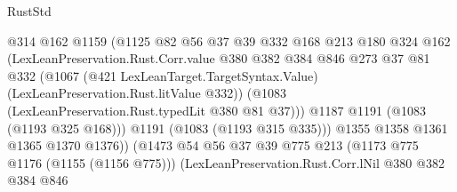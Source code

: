 \begin{lexlean}{RustStd}
\begin{coremodule}
                                        @314
                                        @162
                                        @1159
                                        (@1125
                                          @82
                                          @56
                                          @37
                                          @39
                                          @332
                                          @168
                                          @213
                                          @180
                                          @324
                                          @162
                                          (LexLeanPreservation.Rust.Corr.value
                                            @380
                                            @382
                                            @384
                                            @846
                                            @273
                                            @37
                                            @81
                                            @332
                                            (@1067
                                              (@421 LexLeanTarget.TargetSyntax.Value)
                                              (LexLeanPreservation.Rust.litValue @332))
                                            (@1083
                                              (LexLeanPreservation.Rust.typedLit @380 @81 @37)))
                                          @1187
                                          @1191
                                          (@1083 (@1193 @325 @168)))
                                        @1191
                                        (@1083 (@1193 @315 @335)))
                                      @1355
                                      @1358
                                      @1361
                                      @1365
                                      @1370
                                      @1376))
                                  (@1473
                                    @54
                                    @56
                                    @37
                                    @39
                                    @775
                                    @213
                                    (@1173 @775 @1176 (@1155 (@1156 @775)))
                                    (LexLeanPreservation.Rust.Corr.lNil
                                      @380
                                      @382
                                      @384
                                      @846

\end{coremodule}
\end{lexlean}
